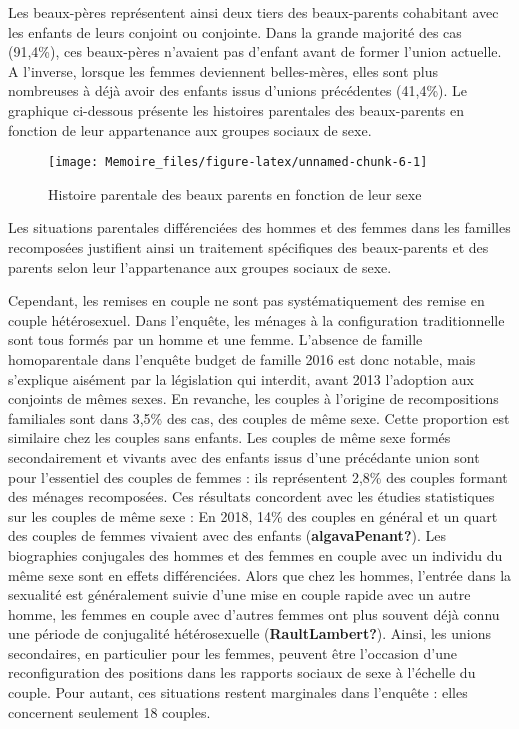 \documentclass[
  12pt,
]{book}
\begin{document}
Les beaux-pères représentent ainsi deux tiers des beaux-parents
cohabitant avec les enfants de leurs conjoint ou conjointe. Dans la
grande majorité des cas (91,4\%), ces beaux-pères n'avaient pas d'enfant
avant de former l'union actuelle. A l'inverse, lorsque les femmes
deviennent belles-mères, elles sont plus nombreuses à déjà avoir des
enfants issus d'unions précédentes (41,4\%). Le graphique ci-dessous
présente les histoires parentales des beaux-parents en fonction de leur
appartenance aux groupes sociaux de sexe.

\begin{figure}[h]

{\centering \texttt{[image: Memoire\_files/figure-latex/unnamed-chunk-6-1]} 

}

\caption{Histoire parentale des beaux parents en fonction de leur sexe}\label{fig:unnamed-chunk-6}
\end{figure}

Les situations parentales différenciées des hommes et des femmes dans
les familles recomposées justifient ainsi un traitement spécifiques des
beaux-parents et des parents selon leur l'appartenance aux groupes
sociaux de sexe.

Cependant, les remises en couple ne sont pas systématiquement des remise
en couple hétérosexuel. Dans l'enquête, les ménages à la configuration
traditionnelle sont tous formés par un homme et une femme. L'absence de
famille homoparentale dans l'enquête budget de famille 2016 est donc
notable, mais s'explique aisément par la législation qui interdit, avant
2013 l'adoption aux conjoints de mêmes sexes. En revanche, les couples à
l'origine de recompositions familiales sont dans 3,5\% des cas, des
couples de même sexe. Cette proportion est similaire chez les couples
sans enfants. Les couples de même sexe formés secondairement et vivants
avec des enfants issus d'une précédante union sont pour l'essentiel des
couples de femmes : ils représentent 2,8\% des couples formant des
ménages recomposées. Ces résultats concordent avec les étudies
statistiques sur les couples de même sexe : En 2018, 14\% des couples en
général et un quart des couples de femmes vivaient avec des enfants
(\textbf{algavaPenant?}). Les biographies conjugales des hommes et des
femmes en couple avec un individu du même sexe sont en effets
différenciées. Alors que chez les hommes, l'entrée dans la sexualité est
généralement suivie d'une mise en couple rapide avec un autre homme, les
femmes en couple avec d'autres femmes ont plus souvent déjà connu une
période de conjugalité hétérosexuelle (\textbf{RaultLambert?}). Ainsi,
les unions secondaires, en particulier pour les femmes, peuvent être
l'occasion d'une reconfiguration des positions dans les rapports sociaux
de sexe à l'échelle du couple. Pour autant, ces situations restent
marginales dans l'enquête : elles concernent seulement 18 couples.
\end{document}

